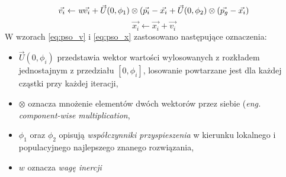 \begin{equation} \label{eq:pso_v}
\vec{v_i} \leftarrow \emph{w}\vec{v_i} + \vec{U}(0,\phi_1)\otimes(\vec{p_i}-\vec{x_i}+\vec{U}(0,\phi_2)\otimes(\vec{p_g}-\vec{x_i})
\end{equation}
\begin{equation} \label{eq:pso_x}
\vec{x_i} \leftarrow \vec{x_i} + \vec{v_i}
\end{equation}
W wzorach \ref{eq:pso_v} i \ref{eq:pso_x} zastosowano następujące oznaczenia:
\begin{itemize}
\item $\vec{U}(0,\phi_i)$ przedstawia wektor wartości wylosowanych z rozkładem jednostajnym z przedziału $[0, \phi_i]$, losowanie powtarzane jest dla każdej cząstki przy każdej iteracji,
\item $\otimes$ oznacza mnożenie elementów dwóch wektorów przez siebie (\emph{eng. component-wise multiplication},
\item $\phi_1$ oraz $\phi_2$ opisują \emph{współczynniki przyspieszenia} w kierunku lokalnego i populacyjnego najlepszego znanego rozwiązania,
\item $w$ oznacza \emph{wagę inercji}
\end{itemize}

